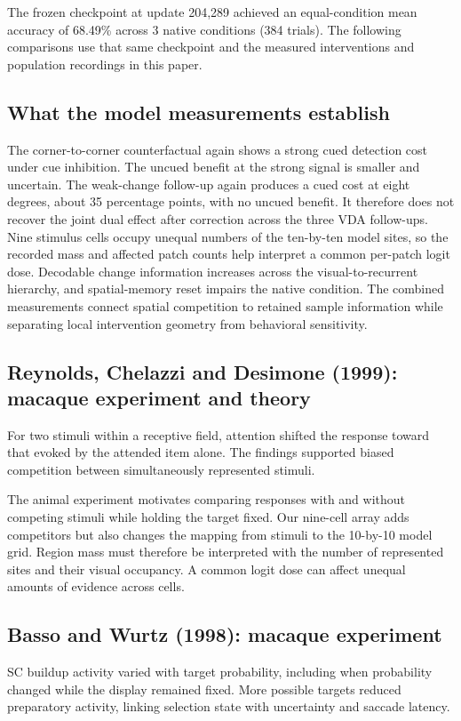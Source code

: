 \documentclass[11pt]{article}
\begin{document}
The frozen checkpoint at update 204,289 achieved an equal-condition mean accuracy of 68.49\% across 3 native conditions (384 trials). The following comparisons use that same checkpoint and the measured interventions and population recordings in this paper.

\subsection{What the model measurements establish}
The corner-to-corner counterfactual again shows a strong cued detection cost under cue inhibition. The uncued benefit at the strong signal is smaller and uncertain. The weak-change follow-up again produces a cued cost at eight degrees, about 35 percentage points, with no uncued benefit. It therefore does not recover the joint dual effect after correction across the three VDA follow-ups. Nine stimulus cells occupy unequal numbers of the ten-by-ten model sites, so the recorded mass and affected patch counts help interpret a common per-patch logit dose. Decodable change information increases across the visual-to-recurrent hierarchy, and spatial-memory reset impairs the native condition. The combined measurements connect spatial competition to retained sample information while separating local intervention geometry from behavioral sensitivity.

\subsection{Reynolds, Chelazzi and Desimone (1999): macaque experiment and theory}
For two stimuli within a receptive field, attention shifted the response toward that evoked by the attended item alone. The findings supported biased competition between simultaneously represented stimuli. \cite{bio_competition}

The animal experiment motivates comparing responses with and without competing stimuli while holding the target fixed. Our nine-cell array adds competitors but also changes the mapping from stimuli to the 10-by-10 model grid. Region mass must therefore be interpreted with the number of represented sites and their visual occupancy. A common logit dose can affect unequal amounts of evidence across cells.

\subsection{Basso and Wurtz (1998): macaque experiment}
SC buildup activity varied with target probability, including when probability changed while the display remained fixed. More possible targets reduced preparatory activity, linking selection state with uncertainty and saccade latency. \cite{bio_basso}
\end{document}
